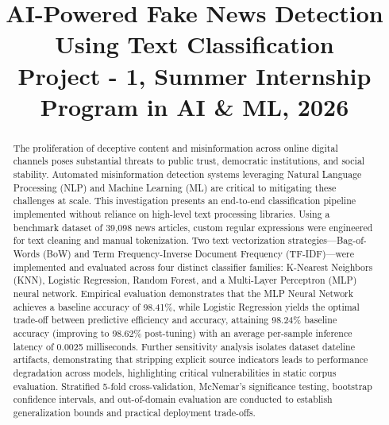 \documentclass[conference]{IEEEtran}
\begin{document}
\title{AI-Powered Fake News Detection Using Text Classification\\
{\footnotesize \textbf{Project - 1, Summer Internship Program in AI \& ML, 2026}}
}

\author{
}

\maketitle

\begin{abstract}
The proliferation of deceptive content and misinformation across online digital channels poses substantial threats to public trust, democratic institutions, and social stability. Automated misinformation detection systems leveraging Natural Language Processing (NLP) and Machine Learning (ML) are critical to mitigating these challenges at scale. This investigation presents an end-to-end classification pipeline implemented without reliance on high-level text processing libraries. Using a benchmark dataset of 39,098 news articles, custom regular expressions were engineered for text cleaning and manual tokenization. Two text vectorization strategies---Bag-of-Words (BoW) and Term Frequency-Inverse Document Frequency (TF-IDF)---were implemented and evaluated across four distinct classifier families: K-Nearest Neighbors (KNN), Logistic Regression, Random Forest, and a Multi-Layer Perceptron (MLP) neural network. Empirical evaluation demonstrates that the MLP Neural Network achieves a baseline accuracy of 98.41\%, while Logistic Regression yields the optimal trade-off between predictive efficiency and accuracy, attaining 98.24\% baseline accuracy (improving to 98.62\% post-tuning) with an average per-sample inference latency of 0.0025 milliseconds. Further sensitivity analysis isolates dataset dateline artifacts, demonstrating that stripping explicit source indicators leads to performance degradation across models, highlighting critical vulnerabilities in static corpus evaluation. Stratified 5-fold cross-validation, McNemar's significance testing, bootstrap confidence intervals, and out-of-domain evaluation are conducted to establish generalization bounds and practical deployment trade-offs.
\end{abstract}
\end{document}
